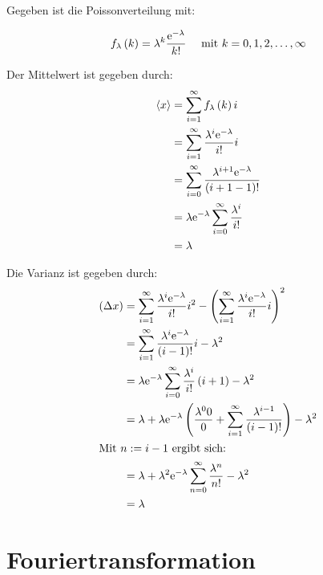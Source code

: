 \documentclass[11pt, ngerman, fleqn, DIV=15, headinclude]{scrartcl}
\begin{document}
\subsection{}

Gegeben ist die Poissonverteilung mit:

\begin{align}
	f_\lambda\left( k \right) = \lambda^k \frac{\mathrm e^{-\lambda}}{k!} \quad\text{ mit } k =
	0,1,2,\ldots,\infty
\end{align}

Der Mittelwert ist gegeben durch:
\begin{align*}
	\langle x \rangle &= \sum_{i=1}^\infty f_\lambda\left( k \right) i\\
	&= \sum_{i=1}^\infty \frac{\lambda^i \mathrm e^{-\lambda}}{i!}i\\
	&= \sum_{i=0}^\infty \frac{\lambda^{i+1}
	\mathrm e^{-\lambda}}{\left( i+1-1 \right)!}\\
	&= \lambda \mathrm e^{-\lambda} \sum_{i=0}^\infty \frac{\lambda^i}{i!}\\
	&= \lambda
\end{align*}

Die Varianz ist gegeben durch:
\begin{align*}
	\left( \Delta x \right) &= \sum_{i=1}^\infty \frac{\lambda^i
		\mathrm e^{-\lambda}}{i!} i^2 - \left( \sum_{i=1}^\infty
		\frac{\lambda^i \mathrm e^{-\lambda}}{i!} i \right)^2\\
		&= \sum_{i=1}^\infty \frac{\lambda^i
			\mathrm e^{-\lambda}}{\left( i-1 \right)!} i - \lambda^2\\
			&= \lambda \mathrm e^{-\lambda} \sum_{i=0}^\infty
			\frac{\lambda^i}{i!} \left( i+1 \right) - \lambda^2\\
		&= \lambda + \lambda \mathrm e^{-\lambda}\left(  \frac{\lambda^0 0}0 +
		\sum_{i=1}^\infty \frac{\lambda^{i-1}}{\left( i-1 \right)!}  \right)
		-\lambda^2\\
	\intertext{Mit $n := i-1$ ergibt sich:}
	&= \lambda + \lambda^2 \mathrm e^{-\lambda} \sum_{n=0}^\infty
	\frac{\lambda^n}{n!} - \lambda^2\\
	&= \lambda
\end{align*}

\subsection{}


\section{Fouriertransformation}
\end{document}
